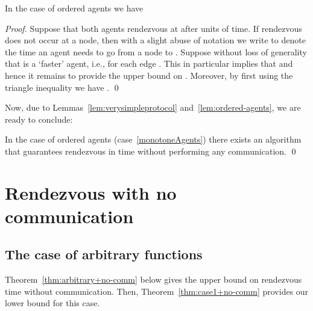 \documentclass{llncs}
\begin{document}
\begin{lemma} \label{lem:ordered-agents}
In the case of ordered agents we have

\end{lemma}	
\begin{proof}
Suppose that both agents rendezvous at  after  units of time.
If rendezvous does not occur at a node, then with a slight abuse of notation we write  to denote the time an agent  needs to go from a node  to . 
Suppose without loss of generality that  is a `faster' agent, i.e.,  for each edge .
This in particular implies that  and hence it remains to provide the upper bound on .
Moreover, by first using the triangle inequality we have
.
\qed\end{proof}

Now, due to Lemmas~\ref{lem:verysimpleprotocol} and~\ref{lem:ordered-agents}, we are ready to conclude:
\begin {theorem} \label{thm:orderedagents}
In the case of ordered agents (case~\ref{monotoneAgents}) there exists an algorithm that guarantees rendezvous in time 
without performing any communication. \qed
\end{theorem}


\section{Rendezvous with no communication}

\subsection{The case of arbitrary functions}
Theorem~\ref{thm:arbitrary+no-comm} below gives the upper bound on rendezvous time without communication.
Then, Theorem~\ref{thm:case1+no-comm} provides our lower bound for this case.
\end{document}
